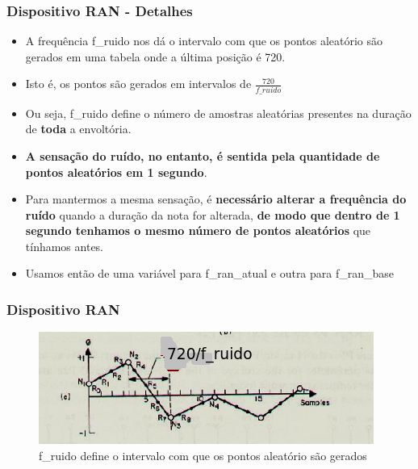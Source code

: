 \documentclass{beamer}
\begin{document}
\begin{frame}
 \frametitle{Dispositivo RAN - Detalhes}
 \begin{itemize}
 	\item A frequência f\_ruido nos dá o intervalo com que os pontos aleatório são gerados
 	em uma tabela onde a última posição é 720.
 	\item Isto é, os pontos são gerados em intervalos de $\frac{720}{f\_ruido}$
 	\item Ou seja, f\_ruido define o número de amostras aleatórias presentes na duração
 	de \textbf{toda} a envoltória.
 	\item \textbf{A sensação do ruído, no entanto, é sentida pela quantidade de pontos aleatórios em 1 segundo}.
 	\item Para mantermos a mesma sensação, é\textbf{ necessário alterar a frequência do ruído} quando a duração da nota for alterada, \textbf{de modo que dentro de 1 segundo tenhamos o mesmo
 	número de pontos aleatórios} que tínhamos antes.
 	\item Usamos então de uma variável para f\_ran\_atual e outra para f\_ran\_base
 \end{itemize}
\end{frame}

\begin{frame}
 \frametitle{Dispositivo RAN}
 \begin{figure}
  \includegraphics[scale=1.0]{./images/f_ruido.png}
  \caption{f\_ruido define o intervalo com que os pontos aleatório são gerados}
   \end{figure}
\end{frame}
\end{document}
